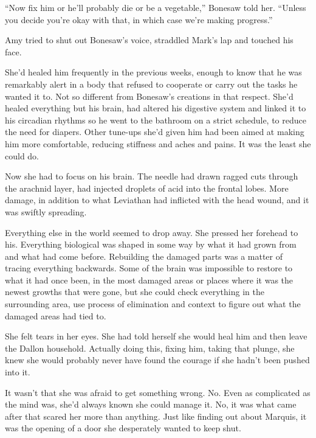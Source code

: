 ``Now fix him or he'll probably die or be a vegetable,'' Bonesaw told her.  ``Unless you decide you're okay with that, in which case we're making progress.''



Amy tried to shut out Bonesaw's voice, straddled Mark's lap and touched his face.



She'd healed him frequently in the previous weeks, enough to know that he was remarkably alert in a body that refused to cooperate or carry out the tasks he wanted it to.  Not so different from Bonesaw's creations in that respect.  She'd healed everything but his brain, had altered his digestive system and linked it to his circadian rhythms so he went to the bathroom on a strict schedule, to reduce the need for diapers.  Other tune-ups she'd given him had been aimed at making him more comfortable, reducing stiffness and aches and pains.  It was the least she could do.



Now she had to focus on his brain.  The needle had drawn ragged cuts through the arachnid layer, had injected droplets of acid into the frontal lobes.  More damage, in addition to what Leviathan had inflicted with the head wound, and it was swiftly spreading.



Everything else in the world seemed to drop away.  She pressed her forehead to his.  Everything biological was shaped in some way by what it had grown from and what had come before.  Rebuilding the damaged parts was a matter of tracing everything backwards.  Some of the brain was impossible to restore to what it had once been, in the most damaged areas or places where it was the newest growths that were gone, but she could check everything in the surrounding area, use process of elimination and context to figure out what the damaged areas had tied to.



She felt tears in her eyes.  She had told herself she would heal him and then leave the Dallon household.  Actually doing this, fixing him, taking that plunge, she knew she would probably never have found the courage if she hadn't been pushed into it.



It wasn't that she was afraid to get something wrong.  No.  Even as complicated as the mind was, she'd always known she could manage it.  No, it was what came after that scared her more than anything.  Just like finding out about Marquis, it was the opening of a door she desperately wanted to keep shut.



